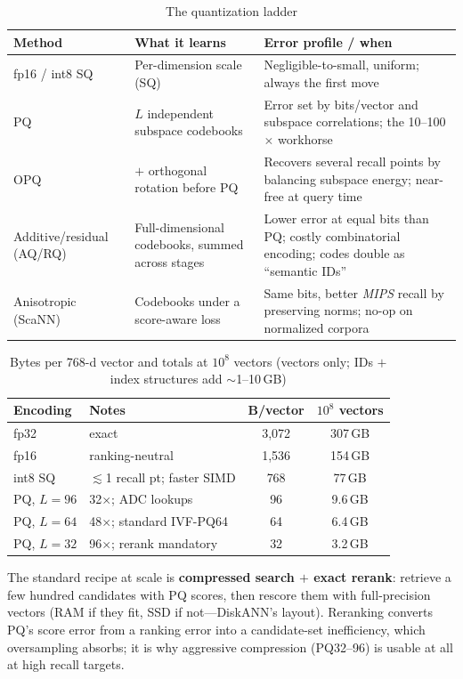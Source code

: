 \begin{table}[H]
\centering
\caption{The quantization ladder}
\label{sr:tab:quant_ladder}
\begin{tabularx}{\textwidth}{lXX}
\toprule
\textbf{Method} & \textbf{What it learns} & \textbf{Error profile / when} \\
\midrule
fp16 / int8 SQ & Per-dimension scale (SQ) & Negligible-to-small, uniform; always the first move \\
PQ & $L$ independent subspace codebooks & Error set by bits/vector and subspace correlations; the 10--100$\times$ workhorse \\
OPQ & $+$ orthogonal rotation before PQ & Recovers several recall points by balancing subspace energy; near-free at query time \\
Additive/residual (AQ/RQ) & Full-dimensional codebooks, summed across stages & Lower error at equal bits than PQ; costly combinatorial encoding; codes double as ``semantic IDs'' \\
Anisotropic (ScaNN) & Codebooks under a score-aware loss & Same bits, better \emph{MIPS} recall by preserving norms; no-op on normalized corpora \\
\bottomrule
\end{tabularx}
\end{table}

\begin{table}[H]
\centering
\caption{Bytes per 768-d vector and totals at $10^8$ vectors (vectors only; IDs $+$ index structures add $\sim$1--10\,GB)}
\label{sr:tab:memory_math}
\begin{tabularx}{\textwidth}{lXcc}
\toprule
\textbf{Encoding} & \textbf{Notes} & \textbf{B/vector} & \textbf{$10^8$ vectors} \\
\midrule
fp32 & exact & 3{,}072 & 307\,GB \\
fp16 & ranking-neutral & 1{,}536 & 154\,GB \\
int8 SQ & $\lesssim$1 recall pt; faster SIMD & 768 & 77\,GB \\
PQ, $L{=}96$ & 32$\times$; ADC lookups & 96 & 9.6\,GB \\
PQ, $L{=}64$ & 48$\times$; standard IVF-PQ64 & 64 & 6.4\,GB \\
PQ, $L{=}32$ & 96$\times$; rerank mandatory & 32 & 3.2\,GB \\
\bottomrule
\end{tabularx}
\end{table}

\begin{keyinsight}
The standard recipe at scale is \textbf{compressed search $+$ exact rerank}: retrieve a few hundred candidates with PQ scores, then rescore them with full-precision vectors (RAM if they fit, SSD if not---DiskANN's layout). Reranking converts PQ's score error from a ranking error into a candidate-set inefficiency, which oversampling absorbs; it is why aggressive compression (PQ32--96) is usable at all at high recall targets.
\end{keyinsight}

